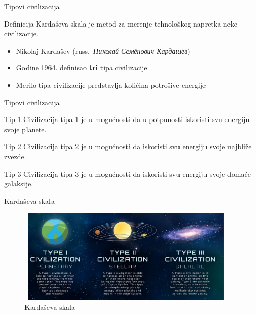 \documentclass[13pt]{beamer}
\begin{document}
\begin{frame}{Tipovi civilizacija}

\begin{block}{Definicija}
Kardaševa skala je metod za merenje tehnološkog napretka neke civilizacije.
\end{block}

\begin{itemize}
    \item Nikolaj Kardašev  (russ.~{\em Николай Семёнович Кардашёв})
    \item Godine 1964. definisao \textbf{tri} tipa civilizacije
    \item Merilo tipa civilizacije predstavlja količina potrošive energije
\end{itemize}

\end{frame}


\begin{frame}{Tipovi civilizacija}


\begin{block}{Tip 1}
Civilizacija tipa 1 je u mogućnosti da u potpunosti iskoristi svu energiju svoje planete.
\end{block}

\begin{block}{Tip 2}
Civilizacija tipa 2 je u mogućnosti da iskoristi svu energiju svoje najbliže zvezde.
\end{block}

\begin{block}{Tip 3}
Civilizacija tipa 3 je u mogućnosti da iskoristi svu energiju svoje domaće galaksije.
\end{block}

\end{frame}

\begin{frame}{Kardaševa skala}

    \begin{figure}
        \centering
        \includegraphics[width=10.5cm, height=4.5cm]{images/Kardaseva skala.png}
        \caption{Kardaševa skala}
        \label{fig:Slika}
    \end{figure}
    
\end{frame}
\end{document}

